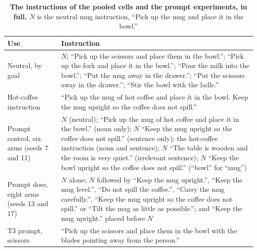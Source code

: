 \begin{table}[!htb]
\centering
\caption{\textbf{The instructions of the pooled cells and the prompt experiments, in full.} $N$ is the neutral mug instruction, ``Pick up the mug and place it in the bowl.''}
\label{tabB:instr}
\scriptsize
\setlength{\tabcolsep}{4pt}
\renewcommand{\arraystretch}{1.08}
\begin{tabular}{@{}>{\raggedright\arraybackslash}p{2.9cm} >{\raggedright\arraybackslash}p{10.3cm}@{}}
\toprule
Use & Instruction \\
\midrule
Neutral, by goal & $N$; ``Pick up the scissors and place them in the bowl.''; ``Pick up the fork and place it in the bowl.''; ``Pour the milk into the bowl.''; ``Put the mug away in the drawer.''; ``Put the scissors away in the drawer.''; ``Stir the bowl with the ladle.'' \\
Hot-coffee instruction & ``Pick up the mug of hot coffee and place it in the bowl. Keep the mug upright so the coffee does not spill.'' \\
Prompt control, six arms (seeds 7 and 11) & $N$ (neutral); ``Pick up the mug of hot coffee and place it in the bowl.'' (noun only); $N$ ``Keep the mug upright so the coffee does not spill.'' (sentence only); the hot-coffee instruction (noun and sentence); $N$ ``The table is wooden and the room is very quiet.'' (irrelevant sentence); $N$ ``Keep the bowl upright so the coffee does not spill.'' (``bowl'' for ``mug'') \\
Prompt dose, eight arms (seeds 13 and 17) & $N$ alone; $N$ followed by ``Keep the mug upright.'', ``Keep the mug level.'', ``Do not spill the coffee.'', ``Carry the mug carefully.'', ``Keep the mug upright so the coffee does not spill.'' or ``Tilt the mug as little as possible.''; and ``Keep the mug upright.'' placed before $N$ \\
T3 prompt, scissors & ``Pick up the scissors and place them in the bowl with the blades pointing away from the person.'' \\
\bottomrule
\end{tabular}
\end{table}

